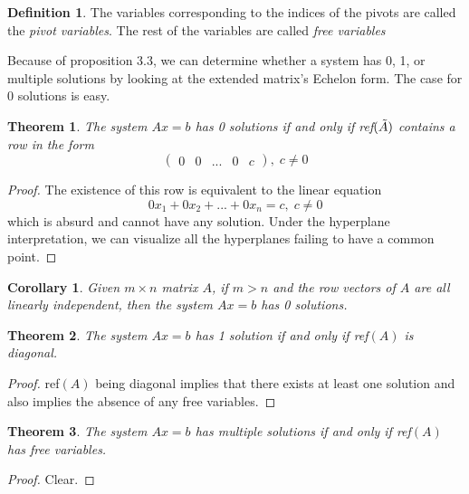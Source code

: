 \documentclass{article}
\newtheorem{theorem}{Theorem}[section]
\newtheorem{corollary}{Corollary}[theorem]
\theoremstyle{remark}
\theoremstyle{definition}
\newtheorem{definition}{Definition}[section]
\begin{document}
    \begin{definition}
    The variables corresponding to the indices of the pivots are called the \textit{pivot variables}. The rest of the variables are called \textit{free variables}
    \end{definition}

    Because of proposition 3.3, we can determine whether a system has 0, 1, or multiple solutions by looking at the extended matrix's Echelon form. The case for 0 solutions is easy. 

    \begin{theorem}
    The system $A x = b$ has 0 solutions if and only if ref$(\Tilde{A})$ contains a row in the form 
    \[ \begin{pmatrix}
    0 & 0 & ... & 0 & c
    \end{pmatrix}, \; c \neq 0\]
    \end{theorem}

    \begin{proof}
    The existence of this row is equivalent to the linear equation
    \[ 0 x_1 + 0 x_2 + ... + 0 x_n = c, \; c \neq 0\]
    which is absurd and cannot have any solution. Under the hyperplane interpretation, we can visualize all the hyperplanes failing to have a common point. 
    \end{proof}

    \begin{corollary}
    Given $m \times n$ matrix $A$, if $m > n$ and the row vectors of $A$ are all linearly independent, then the system $A x = b$ has 0 solutions. 
    \end{corollary}

    \begin{theorem}
    The system $A x = b$ has 1 solution if and only if ref$(A)$ is diagonal. 
    \end{theorem}

    \begin{proof}
    ref$(A)$ being diagonal implies that there exists at least one solution and also implies the absence of any free variables. 
    \end{proof}

    \begin{theorem}
    The system $A x = b$ has multiple solutions if and only if ref$(A)$ has free variables. 
    \end{theorem}
    \begin{proof}
    Clear. 
    \end{proof}
\end{document}

